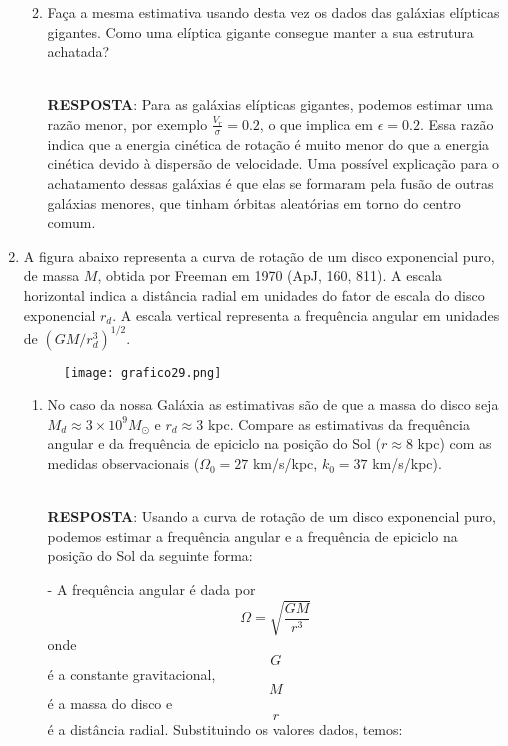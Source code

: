 \documentclass[a4paper,12pt]{article}
\begin{document}
\begin{enumerate}
\begin{enumerate}
\noindent\hrulefill

\item Faça a mesma estimativa usando desta vez os dados das galáxias 
elípticas gigantes. Como uma elíptica gigante consegue manter a sua 
estrutura achatada? 

\noindent\hrulefill\\\textbf{RESPOSTA}: Para as galáxias elípticas gigantes, podemos estimar uma razão menor, por exemplo $\frac{V_r}{\sigma} = 0.2$, o que implica em $\epsilon = 0.2$. Essa razão indica que a energia cinética de rotação é muito menor do que a energia cinética devido à dispersão de velocidade. Uma possível explicação para o achatamento dessas galáxias é que elas se formaram pela fusão de outras galáxias menores, que tinham órbitas aleatórias em torno do centro comum.

\noindent\hrulefill

\end{enumerate}

\item A figura abaixo representa a curva de rotação de um disco exponencial 
puro, de massa $M$, obtida por Freeman em 1970 (ApJ, 160, 811). A escala 
horizontal indica a distância radial em unidades do fator de escala do disco
exponencial $r_d$. A escala vertical representa a frequência angular em 
unidades de $(GM/r_d^3)^{1/2}$.

\begin{figure}[H]
\centering
\texttt{[image: grafico29.png]}
\end{figure}

\begin{enumerate}
\item No caso da nossa Galáxia as estimativas são de que a massa do disco 
seja $M_d \approx 3\times10^9 M_{\odot}$ e $r_d \approx 3$ kpc. Compare as estimativas da frequência angular e da frequência de epiciclo na posição do Sol ($r \approx 8$ kpc) com as medidas observacionais ($\Omega_0 = 27$ km/s/kpc, $k_0 = 37$ km/s/kpc).

\noindent\hrulefill\\\textbf{RESPOSTA}: Usando a curva de rotação de um disco exponencial puro, podemos estimar a frequência angular e a frequência de epiciclo na posição do Sol da seguinte forma:

- A frequência angular é dada por $$\Omega = \sqrt{\frac{GM}{r^3}}$$ onde $$G$$ é a constante gravitacional, $$M$$ é a massa do disco e $$r$$ é a distância radial. Substituindo os valores dados, temos:


\end{enumerate}
\end{enumerate}
\end{document}
